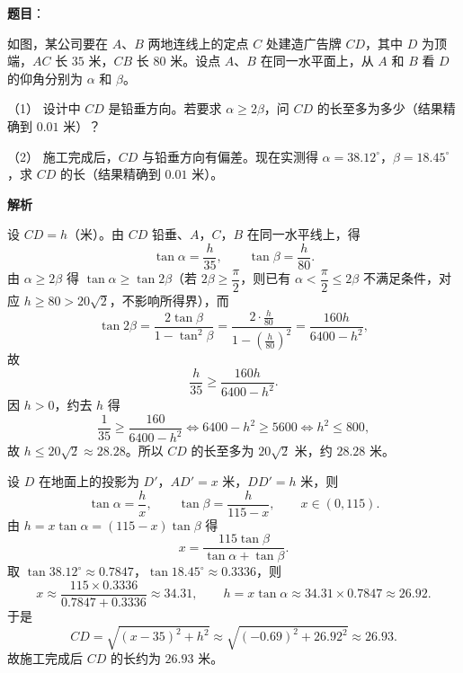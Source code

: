 \begin{answer}

\textbf{题目}：

如图，某公司要在 $A$、$B$ 两地连线上的定点 $C$ 处建造广告牌 $CD$，其中 $D$ 为顶端，$AC$ 长 $35$ 米，$CB$ 长 $80$ 米。设点 $A$、$B$ 在同一水平面上，从 $A$ 和 $B$ 看 $D$ 的仰角分别为 $\alpha$ 和 $\beta$。
\nopagebreak[4]
\begin{center}\end{center}
\nopagebreak[4]
（1） 设计中 $CD$ 是铅垂方向。若要求 $\alpha\geqslant2\beta$，问 $CD$ 的长至多为多少（结果精确到 $0.01$ 米）？

（2） 施工完成后，$CD$ 与铅垂方向有偏差。现在实测得 $\alpha=38.12^\circ$，$\beta=18.45^\circ$，求 $CD$ 的长（结果精确到 $0.01$ 米）。

\textbf{解析}


设 $CD=h$（米）。由 $CD$ 铅垂、$A$，$C$，$B$ 在同一水平线上，得
\nopagebreak[4]
\[\tan\alpha=\frac h{35},\qquad\tan\beta=\frac h{80}.\]
由 $\alpha\geqslant2\beta$ 得 $\tan\alpha\geqslant\tan2\beta$（若 $2\beta\geqslant\dfrac\pi2$，则已有 $\alpha<\dfrac\pi2\leqslant2\beta$ 不满足条件，对应 $h\geqslant80>20\sqrt2$，不影响所得界），而
\nopagebreak[4]
\[\tan2\beta=\frac{2\tan\beta}{1-\tan^2\beta}=\frac{2\cdot\frac h{80}}{1-\left(\frac h{80}\right)^2}=\frac{160h}{6400-h^2},\]
故
\nopagebreak[4]
\[\frac h{35}\geqslant\frac{160h}{6400-h^2}.\]
因 $h>0$，约去 $h$ 得
\nopagebreak[4]
\[\frac1{35}\geqslant\frac{160}{6400-h^2}\iff6400-h^2\geqslant5600\iff h^2\leqslant800,\]
故 $h\leqslant20\sqrt2\approx28.28$。所以 $CD$ 的长至多为 $20\sqrt2$ 米，约 $28.28$ 米。


设 $D$ 在地面上的投影为 $D'$，$AD'=x$ 米，$DD'=h$ 米，则
\nopagebreak[4]
\[\tan\alpha=\frac hx,\qquad\tan\beta=\frac h{115-x},\qquad x\in(0,115).\]
由 $h=x\tan\alpha=(115-x)\tan\beta$ 得
\nopagebreak[4]
\[x=\frac{115\tan\beta}{\tan\alpha+\tan\beta}.\]
取 $\tan38.12^\circ\approx0.7847$，$\tan18.45^\circ\approx0.3336$，则
\nopagebreak[4]
\[x\approx\frac{115\times0.3336}{0.7847+0.3336}\approx34.31,\qquad h=x\tan\alpha\approx34.31\times0.7847\approx26.92 .\]
于是
\nopagebreak[4]
\[CD=\sqrt{(x-35)^2+h^2}\approx\sqrt{(-0.69)^2+26.92^2}\approx26.93 .\]
故施工完成后 $CD$ 的长约为 $26.93$ 米。



\end{answer}
